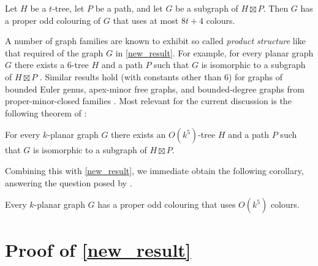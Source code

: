 \documentclass{patmorin}
\begin{document}
\begin{thm}\label{new_result}
  Let $H$ be a $t$-tree, let $P$ be a path, and let $G$ be a subgraph of $H\boxtimes P$. Then $G$ has a proper odd colouring of $G$ that uses at most $8t+4$ colours.
\end{thm}

A number of graph families are known to exhibit so called \emph{product structure} like that required of the graph $G$ in \cref{new_result}.  For example, for every planar graph $G$ there exists a $6$-tree $H$ and a path $P$ such that $G$ is isomorphic to a subgraph of $H\boxtimes P$ \cite{ueckerdt.wood.ea:improved}.  Similar results hold (with constants other than $6$) for graphs of bounded Euler genus, apex-minor free graphs, and bounded-degree graphs from proper-minor-closed families \cite{dujmovic.joret.ea:planar,dujmovic.esperet.ea:clustered}.  Most relevant for the current discussion is the following theorem of \citet{dujmovic.morin.ea:structure}:

\begin{thm}\label{k_planar}
  For every $k$-planar graph $G$ there exists an $O(k^5)$-tree $H$ and a path $P$ such that $G$ is isomorphic to a subgraph of $H\boxtimes P$.
\end{thm}

Combining this with \cref{new_result}, we immediate obtain the following corollary, answering the question posed by \citet{cranston.lafferty.ea:note}.

\begin{cor}
  Every $k$-planar graph $G$ has a proper odd colouring that uses $O(k^5)$ colours.
\end{cor}

\section{Proof of \cref{new_result}}
\end{document}
